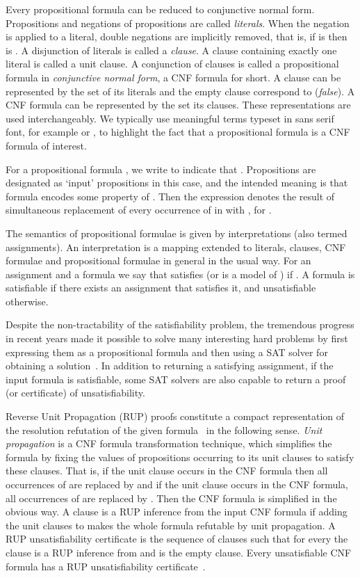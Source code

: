 \documentclass{article} \usepackage[utf8]{inputenc}
\begin{document}
Every propositional formula can be reduced to conjunctive normal form.  Propositions and
negations of propositions are called \emph{literals}.
When the negation is applied to a literal, double negations are implicitly 
removed, that is, if  is  then  is .
A disjunction of literals
is called a \emph{clause}. A clause containing exactly one literal is called
a unit clause. A conjunction of clauses is called a
propositional formula in \emph{conjunctive normal form}, a CNF formula for short. 
A clause can be represented by the set of its literals and the empty 
clause correspond to  (\emph{false}).
A CNF formula can be represented by the set its clauses. These
representations are used interchangeably. 
We typically use meaningful terms typeset in sans serif font,
for example  or ,
to highlight the fact that a propositional formula is a CNF formula of interest.

For a propositional formula , we write  to indicate
that . Propositions 
are designated as `input' propositions in this case, and the intended meaning
is that formula  encodes some property of . Then the
expression  denotes the result of simultaneous replacement
of every occurrence of  in   with , for .

The semantics of propositional formulae is given by interpretations (also termed
assignments).  An
interpretation  is a mapping  extended to literals, clauses,
CNF formulae and propositional formulae in general in the usual way.
For an assignment  and a formula  we say that  satisfies  
(or  is a model of ) if .
A formula  is satisfiable if there exists an assignment that satisfies
it, and unsatisfiable otherwise.

Despite the non-tractability of the satisfiability problem, the tremendous
progress in recent years made it possible to solve many interesting hard
problems by first expressing them as a propositional formula and then
using a {SAT solver} for obtaining a solution~\cite{satHB}. In addition to
returning a satisfying assignment, if the input formula is satisfiable, some
SAT solvers are also capable to return a proof (or certificate) of
unsatisfiability. 

Reverse Unit Propagation (RUP) proofs constitute a compact representation of 
the resolution refutation of the given formula~\cite{GoldbergN03} in the following sense.
\emph{Unit propagation} is a CNF formula transformation
technique, which simplifies the formula by fixing the values of 
propositions occurring to its unit clauses to satisfy these clauses. 
That is, if the unit clause  occurs in the CNF formula then 
all occurrences of  are replaced by  and if the unit clause
  occurs in the CNF formula, all occurrences of 
 are replaced by . Then the CNF formula is simplified in the obvious way.
A clause  is a RUP inference from the input CNF formula
 if adding the unit clauses  to  makes the whole
formula refutable by unit propagation.  A RUP unsatisfiability certificate is
the sequence of clauses  such that for every  
the clause  is a RUP inference from  and
 is the empty clause.  Every unsatisfiable CNF formula has a RUP
unsatisfiability certificate~\cite{GoldbergN03}.
\end{document}
